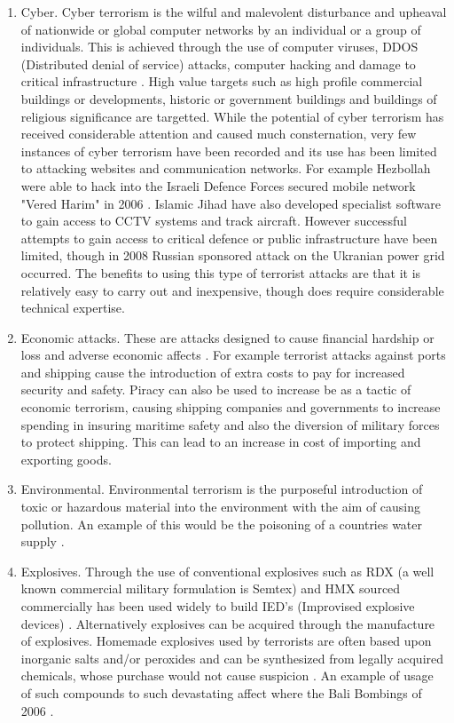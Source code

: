 \begin{enumerate}
\item Cyber. Cyber terrorism is the wilful and malevolent disturbance and upheaval of nationwide or global computer networks by an individual or a group of individuals. This is achieved through the use of computer viruses, DDOS (Distributed denial of service) attacks, computer hacking and damage to critical infrastructure \citep{Golandsky2016}. High value targets  such as high profile commercial buildings or developments, historic or government buildings and buildings of religious significance are targetted. While the potential of cyber terrorism has received considerable attention and caused much consternation, very few instances of cyber terrorism have been recorded and its use has been limited to attacking websites and communication networks. For example Hezbollah were able to hack into the Israeli Defence Forces secured mobile network "Vered Harim" in 2006 \citep{Golandsky2016}. Islamic Jihad have also developed specialist software to gain access to CCTV systems and track aircraft. However successful attempts to gain access to critical defence or public infrastructure have been limited, though in 2008 Russian sponsored attack on the Ukranian power grid \citep{Cybersecurity2016Perez} occurred. The benefits to using this type of terrorist attacks are that it is relatively easy to carry out and inexpensive, though does require considerable technical expertise. 
\item Economic attacks. These are attacks designed to cause financial hardship or loss and adverse economic affects \citep{drake1998role}. For example terrorist attacks against ports and shipping cause the introduction of extra costs to pay for increased security and safety. Piracy can also be used to increase be as a tactic of economic terrorism, causing shipping companies and governments to increase spending in insuring maritime safety and also the diversion of military forces to protect shipping. This can lead to an increase in cost of importing and exporting goods. 
\item Environmental. Environmental terrorism is the purposeful introduction of toxic or hazardous material into the environment with the aim of causing pollution. An example of this would be the poisoning of a countries water supply \citep{gleick2006water}.
\item Explosives. Through the use of conventional explosives such as RDX (a well known commercial military formulation is Semtex) and HMX sourced commercially has been used widely to build IED's (Improvised explosive devices) \citep{kopp2008technology}. Alternatively explosives can be acquired through the manufacture of explosives. Homemade explosives used by terrorists are often based upon inorganic salts and/or peroxides and can be synthesized from legally acquired chemicals, whose purchase would not cause suspicion \citep{johns2008identification}.  An example of usage of such compounds to such devastating affect where the Bali Bombings of 2006 \citep{royds2005case}.

\end{enumerate}
